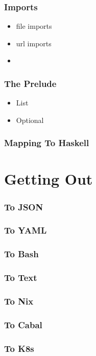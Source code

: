 \documentclass{beamer}
\begin{document}
 \begin{frame}
   \frametitle{Imports}
   \begin{itemize}
   \item file imports
   \item url imports
   \item
   \end{itemize}
 \end{frame}

 \begin{frame}
   \frametitle{The Prelude}
   \begin{itemize}
   \item List
   \item Optional
   \end{itemize}
 \end{frame}

 \begin{frame}
   \frametitle{Mapping To Haskell}
 \end{frame}

 \section{Getting Out}

 \begin{frame}
   \frametitle{To JSON}
 \end{frame}

 \begin{frame}
   \frametitle{To YAML}
 \end{frame}

 \begin{frame}
   \frametitle{To Bash}
 \end{frame}

 \begin{frame}
   \frametitle{To Text}
 \end{frame}

 \begin{frame}
   \frametitle{To Nix}
 \end{frame}

 \begin{frame}
   \frametitle{To Cabal}
 \end{frame}

 \begin{frame}
   \frametitle{To K8s}
 \end{frame}
\end{document}
